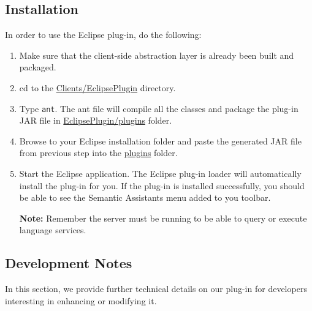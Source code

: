 \subsection{Installation}
\label{subsec:eclipse_install}
In order to use the Eclipse plug-in, do the following:

\begin{enumerate}

  \item Make sure that the client-side abstraction layer is already been built
and packaged.

  \item cd to the \url{Clients/EclipsePlugin} directory.

  \item Type \texttt{ant}. The ant file will compile all the classes and package
the plug-in JAR file in \url{EclipsePlugin/plugins} folder.

  \item Browse to your Eclipse installation folder and paste the generated JAR
file from previous step into the \url{plugins} folder.
  
  \item Start the Eclipse application. The Eclipse plug-in loader will
automatically install the plug-in for you. If the plug-in is installed
successfully, you should be able to see the Semantic Assistants menu added to
you toolbar.

  \textbf{Note:} Remember the server must be running to be able to query or
execute language services.

\end{enumerate}

\subsection{Development Notes}
\label{subsec:eclipse.development}
In this section, we provide further technical details on our plug-in for
developers interesting in enhancing or modifying it.

